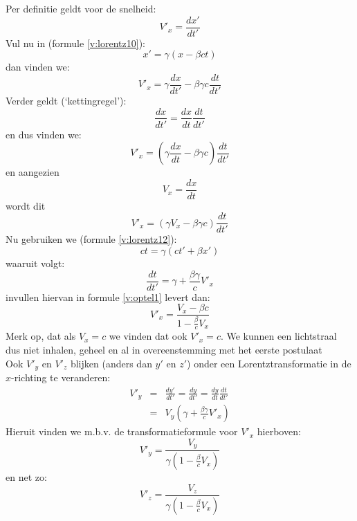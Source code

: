 Per definitie geldt voor de snelheid:
\begin{displaymath}
V'_{x} = \frac{dx'}{dt'}
\end{displaymath}
Vul nu in (formule \ref{v:lorentz10}):
\begin{displaymath}
x' = \gamma (x - \beta ct)
\end{displaymath}
dan vinden we:
\begin{displaymath}
V'_{x} = \gamma \frac{dx}{dt'} - \beta \gamma c \frac{dt}{dt'}
\end{displaymath}
Verder geldt (`kettingregel'):
\begin{displaymath}
\frac{dx}{dt'} = \frac{dx}{dt} \frac{dt}{dt'}
\end{displaymath}
en dus vinden we:
\begin{displaymath}
V'_{x} = (\gamma \frac{dx}{dt} - \beta \gamma c)\frac{dt}{dt'}
\end{displaymath}
en aangezien
\begin{displaymath}
V_{x} = \frac{dx}{dt}
\end{displaymath}
wordt dit
\begin{equation}
\label{v:optel1}
V'_{x} = (\gamma V_{x} - \beta \gamma c)\frac{dt}{dt'}
\end{equation}
Nu gebruiken we (formule \ref{v:lorentz12}):
\begin{displaymath}
ct = \gamma (ct' + \beta x')
\end{displaymath}
waaruit volgt:
\begin{displaymath}
\frac{dt}{dt'}  = \gamma + \frac{\beta \gamma}{c} V'_{x}
\end{displaymath}
invullen hiervan in formule \ref{v:optel1} levert dan:
\begin{displaymath}
V'_{x} = \frac{V_{x} - \beta c}{1 - \frac{\beta}{c} V_{x}}
\end{displaymath}
Merk op, dat als $V_{x} = c$ we vinden dat ook $V'_{x} = c$.
We kunnen een lichtstraal dus niet inhalen, geheel en al in overeenstemming
met het eerste postulaat\\
Ook $V'_{y}$ en $V'_{z}$ blijken (anders dan $y'$ en $z'$) onder een 
Lorentztransformatie in de $x$-richting te veranderen:
\begin{eqnarray*}
V'_{y} & = &  \frac{dy'}{dt'} = \frac{dy}{dt'} = \frac{dy}{dt} \frac{dt}{dt'} \\
       & = &  V_{y} (\gamma + \frac{\beta \gamma}{c} V'_{x})
\end{eqnarray*}
Hieruit vinden we m.b.v. de transformatieformule voor $V'_{x}$ hierboven:
\begin{equation}\label{e:vy}
V'_{y} = \frac{V_{y}}{\gamma (1 - \frac{\beta}{c} V_{x})}
\end{equation}
en net zo:
\begin{equation}
V'_{z} = \frac{V_{z}}{\gamma (1 - \frac{\beta}{c} V_{x})}
\end{equation}


